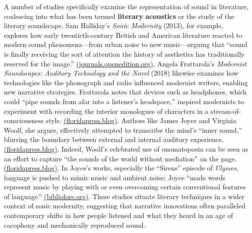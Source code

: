 \documentclass[12pt]{report}
\begin{document}
A number of studies specifically examine the representation of sound in literature, coalescing into what has been termed \textbf{literary acoustics} or the study of the literary soundscape. Sam Halliday’s \textit{Sonic Modernity} (2013), for example, explores how early twentieth-century British and American literature reacted to modern sound phenomena—from urban noise to new music—arguing that “sound is finally receiving the sort of attention the history of aesthetics has traditionally reserved for the image.” \href{https://journals.openedition.org/ebc/2322#:~:text=live%20modernity%21%E2%80%9D%E2%80%99}{(journals.openedition.org)}. Angela Frattarola’s \textit{Modernist Soundscapes: Auditory Technology and the Novel} (2018) likewise examines how technologies like the phonograph and radio influenced modernist writers, enabling new narrative strategies. Frattarola notes that devices such as headphones, which could “pipe sounds from afar into a listener’s headspace,” inspired modernists to experiment with recording the interior monologues of characters in a stream-of-consciousness style. \href{https://floridapress.blog/2018/12/04/modernist-soundscapes/#:~:text=She%20argues%20that%20the%20common,reproduction%20of%20the%20tape%20recorder}{(floridapress.blog)}. Authors like James Joyce and Virginia Woolf, she argues, effectively attempted to transcribe the mind’s “inner sound,” blurring the boundary between external and internal auditory experience. \href{https://floridapress.blog/2018/12/04/modernist-soundscapes/#:~:text=She%20argues%20that%20the%20common,reproduction%20of%20the%20tape%20recorder}{(floridapress.blog)}. Indeed, Woolf’s celebrated use of onomatopoeia can be seen as an effort to capture “the sounds of the world without mediation” on the page. \href{https://floridapress.blog/2018/12/04/modernist-soundscapes/#:~:text=a%20listener%E2%80%99s%20headspace%2C%20inspired%20modernists,reproduction%20of%20the%20tape%20recorder}{(floridapress.blog)}. In Joyce’s works, especially the “Sirens” episode of \textit{Ulysses}, language is pushed to mimic music and ambient noise; Joyce “made words represent music by playing with or even overcoming certain conventional features of language.” \href{https://bibliolore.org/2022/02/02/joyces-musical-sirens/#:~:text=In%20the%20%E2%80%9CSirens%E2%80%9D%20episode%20of,certain%20conventional%20features%20of%20language}{(bibliolore.org)}. These studies situate literary techniques in a wider context of sonic modernity, suggesting that narrative innovations often paralleled contemporary shifts in how people listened and what they heard in an age of cacophony and mechanically reproduced sound.
\end{document}
